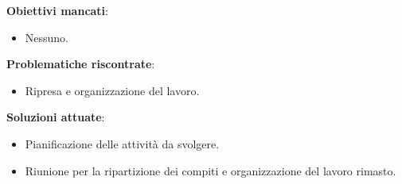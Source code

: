 \textbf{Obiettivi mancati}:
\begin{itemize}
	\item Nessuno.
\end{itemize}

\textbf{Problematiche riscontrate}:
\begin{itemize}
	\item Ripresa e organizzazione del lavoro.
\end{itemize}

\textbf{Soluzioni attuate}:
\begin{itemize}
	\item Pianificazione delle attività da svolgere.
	\item Riunione per la ripartizione dei compiti e organizzazione del lavoro rimasto.
\end{itemize}
